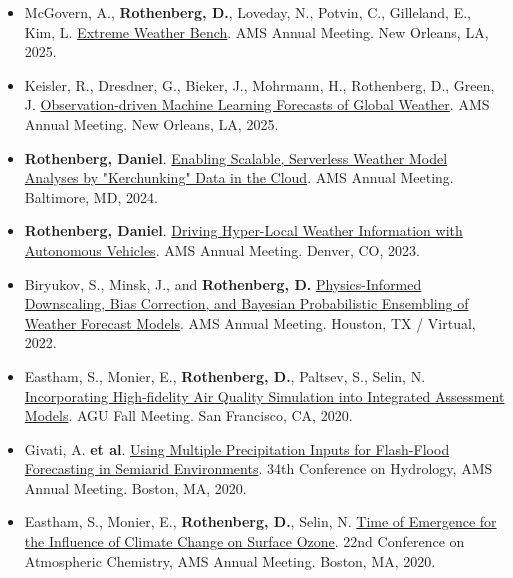 \documentclass[11pt,letterpaper]{article}
\begin{document}
\begin{itemize}[itemindent=-10pt]
 \item McGovern, A., \textbf{Rothenberg, D.}, Loveday, N., Potvin, C., Gilleland, E., Kim, L. \href{https://ams.confex.com/ams/105ANNUAL/meetingapp.cgi/Paper/451220}{Extreme Weather Bench}. AMS Annual Meeting. New Orleans, LA, 2025.
 
 \item Keisler, R., Dresdner, G., Bieker, J., Mohrmann, H., Rothenberg, D., Green, J. \href{https://ams.confex.com/ams/105ANNUAL/meetingapp.cgi/Paper/451380}{Observation-driven Machine Learning Forecasts of Global Weather}.  AMS Annual Meeting. New Orleans, LA, 2025.

 \item \textbf{Rothenberg, Daniel}. \href{https://ams.confex.com/ams/104ANNUAL/meetingapp.cgi/Paper/440122}{Enabling Scalable, Serverless Weather Model Analyses by "Kerchunking" Data in the Cloud}. AMS Annual Meeting. Baltimore, MD, 2024.

 \item \textbf{Rothenberg, Daniel}. \href{https://ams.confex.com/ams/103ANNUAL/meetingapp.cgi/Paper/412555}{Driving Hyper-Local Weather Information with Autonomous Vehicles}. AMS Annual Meeting. Denver, CO, 2023.
 
 \item Biryukov, S., Minsk, J., and \textbf{Rothenberg, D.} \href{https://ams.confex.com/ams/102ANNUAL/meetingapp.cgi/Paper/389735}{Physics-Informed Downscaling, Bias Correction, and Bayesian Probabilistic Ensembling of Weather Forecast Models}. AMS Annual Meeting. Houston, TX / Virtual, 2022.

 \item Eastham, S., Monier, E., \textbf{Rothenberg, D.}, Paltsev, S., Selin, N. \href{https://agu.confex.com/agu/fm20/meetingapp.cgi/Paper/740077}{Incorporating High-fidelity Air Quality Simulation into Integrated Assessment Models}. AGU Fall Meeting. San Francisco, CA, 2020.

 \item Givati, A. \textbf{et al}. \href{https://ams.confex.com/ams/2020Annual/meetingapp.cgi/Paper/369441}{Using Multiple Precipitation Inputs for Flash-Flood Forecasting in Semiarid Environments}. 34th Conference on Hydrology, AMS Annual Meeting. Boston, MA, 2020.

 \item Eastham, S., Monier, E., \textbf{Rothenberg, D.}, Selin, N. \href{https://ams.confex.com/ams/2020Annual/meetingapp.cgi/Paper/369266}{Time of Emergence for the Influence of Climate Change on Surface Ozone}. 22nd Conference on Atmospheric Chemistry, AMS Annual Meeting. Boston, MA, 2020.


\end{itemize}
\end{document}
